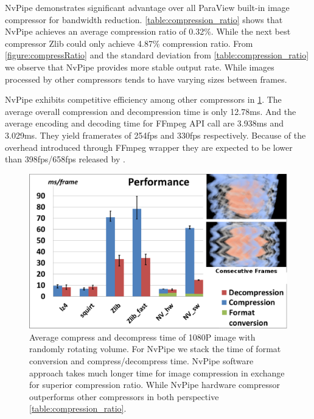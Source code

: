 \documentclass{vgtc}                          %
\begin{document}
NvPipe demonstrates significant advantage over all ParaView built-in image compressor for bandwidth reduction. \ref{table:compression_ratio} shows that NvPipe achieves an average compression ratio of 0.32\%. While the next best compressor Zlib could only achieve 4.87\% compression ratio. From \ref{figure:compressRatio} and the standard deviation from \ref{table:compression_ratio} we observe that NvPipe provides more stable output rate. While images processed by other compressors tends to have varying sizes between frames.

NvPipe exhibits competitive efficiency among other compressors in \ref{figure:time}. The average overall compression and decompression time is only 12.78ms. And the average encoding and decoding time for FFmpeg API call are 3.938ms and 3.029ms. They yield framerates of 254fps and 330fps respectively. Because of the overhead introduced through FFmpeg wrapper they are expected to be lower than 398fps/658fps released by \cite{ref_1}.%

\begin{figure}[t]
  \label{figure:time}
  \centering
  \includegraphics[width=\columnwidth]{Performance.eps}
  \caption{ Average compress and decompress time of 1080P image with randomly rotating volume. For NvPipe we stack the time of format conversion and compress/decompress time. NvPipe software approach takes much longer time for image compression in exchange for superior compression ratio. While NvPipe hardware compressor outperforms other compressors in both perspective \ref{table:compression_ratio}. }
\end{figure}
\end{document}
